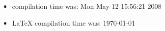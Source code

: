 \documentclass{article}
\begin{document}
\begin{itemize}
  \item \Rlogo{} compilation time was: Mon May 12 15:56:21 2008
  \item \LaTeX{} compilation time was: \today
\end{itemize}


\clearpage
{}


\end{document}

